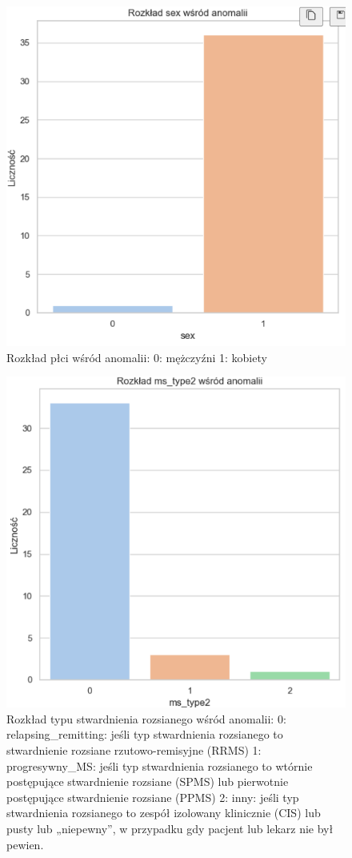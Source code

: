 \documentclass[a4paper,fleqn]{cas-dc}
\begin{document}
\begin{figure}[h]
	\includegraphics[scale=.73]{wykresy/wykres8.png}
	\caption{Rozkład płci wśród anomalii: 0: mężczyźni 1: kobiety}
	\label{FIG:1}
\end{figure}

\begin{figure}[h]
	\includegraphics[scale=.73]{wykresy/wykres9.png}
	\caption{Rozkład typu stwardnienia rozsianego wśród anomalii:  0: relapsing\_remitting: jeśli typ stwardnienia rozsianego to stwardnienie rozsiane rzutowo-remisyjne (RRMS)
1: progresywny\_MS: jeśli typ stwardnienia rozsianego to wtórnie postępujące stwardnienie rozsiane (SPMS) lub pierwotnie postępujące stwardnienie rozsiane (PPMS)
2: inny: jeśli typ stwardnienia rozsianego to zespół izolowany klinicznie (CIS) lub pusty lub „niepewny”, w przypadku gdy pacjent lub lekarz nie był pewien.}
	\label{FIG:1}
\end{figure}
\end{document}
